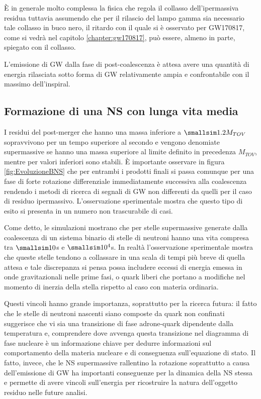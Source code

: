 È in generale molto complessa la fisica che regola il collasso dell'ipermassiva residua tuttavia assumendo che per il rilascio del lampo gamma sia necessario tale collasso in buco nero, il ritardo con il quale si è osservato per GW170817, come si vedrà nel capitolo \ref{chapter:gw170817}, può essere, almeno in parte, spiegato con il collasso.


L'emissione di GW dalla fase di post-coalescenza è attesa avere una quantità di energia rilasciata sotto forma di GW relativamente ampia e confrontabile con il massimo dell'inspiral\cite{sarin2020evolution}. 

\subsection{Formazione di una NS con lunga vita media}
\label{subsection:long_lived}
I residui del post-merger che hanno una massa inferiore a $\smallsim1.2M_{TOV}$ sopravvivono per un tempo superiore al secondo e vengono denomiate supermassive se hanno una massa superiore al limite definito in precedenza $M_{TOV}$, mentre per valori inferiori sono stabili.
È importante osservare in figura \ref{fig:EvoluzioneBNS} che per entrambi i prodotti finali si passa comunque per una fase di forte rotazione differenziale immediatamente successiva alla coalescenza rendendo i metodi di ricerca di segnali di GW non differenti da quelli per il caso di residuo ipermassivo.
L'osservazione sperimentale mostra che questo tipo di esito si presenta in un numero non trascurabile di casi.

Come detto, le simulazioni mostrano che per stelle supermassive generate dalla coalescenza di un sistema binario di stelle di neutroni hanno una vita compresa tra $\smallsim10$s e $\smallsim10^4$s. In realtà l'osservazione sperimentale mostra che queste stelle tendono a collassare in una scala di tempi più breve di quella attesa e tale discrepanza si pensa possa includere eccessi di energia emessa in onde gravitazionali nelle prime fasi, o quark liberi che portano a modifiche nel momento di inerzia della stella rispetto al caso con materia ordinaria.

Questi vincoli hanno grande importanza, soprattutto per la ricerca futura: il fatto che le stelle di neutroni nascenti siano composte da quark non confinati suggerisce che vi sia una transizione di fase adrone-quark dipendente dalla temperatura e, comprendere dove avvenga questa transizione nel diagramma di fase nucleare è un informazione chiave per dedurre informazioni sul comportamento della materia nucleare e di conseguenza sull'equazione di stato.
Il fatto, invece, che le NS supermassive rallentino la rotazione soprattutto a causa dell'emissione di GW ha importanti conseguenze per la dinamica della NS stessa e permette di avere vincoli sull'energia per ricostruire la natura dell'oggetto residuo nelle future analisi\cite{sarin2020evolution}.

